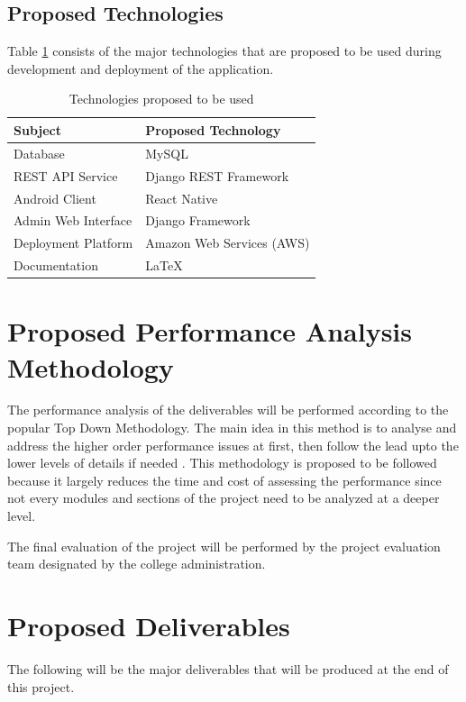 \documentclass[12pt, a4paper, oneside]{article}
\begin{document}
\subsection{Proposed Technologies}
Table \ref{table:tech} consists of the major technologies that are proposed to be used during development and deployment of the application.

\renewcommand{\arraystretch}{1.5}
\begin{table}[h!]
\centering
\begin{tabular}{|l|l|}
\hline
\rowcolor[HTML]{C0C0C0} 
\textbf{Subject}    & \textbf{Proposed Technology} \\ \hline
Database            & MySQL                        \\ \hline
REST API Service    & Django REST Framework        \\ \hline
Android Client  & React Native                 \\ \hline
Admin Web Interface & Django Framework             \\ \hline
Deployment Platform & Amazon Web Services (AWS)    \\ \hline
Documentation & LaTeX \\ \hline
\end{tabular}
\caption{Technologies proposed to be used}
\label{table:tech}
\end{table}

\break
\section{Proposed Performance Analysis Methodology}
The performance analysis of the deliverables will be performed according to the popular Top Down Methodology. The main idea in this method is to analyse and address the higher order performance issues at first, then follow the lead upto the lower levels of details if needed \cite{tdmethod}. This methodology is proposed to be followed because it largely reduces the time and cost of assessing the performance since not every modules and sections of the project need to be analyzed at a deeper level.

The final evaluation of the project will be performed by the project evaluation team designated by the college administration.

\newpage
\newpage
\section{Proposed Deliverables}
The following will be the major deliverables that will be produced at the end of this project.
\end{document}

